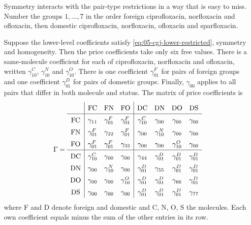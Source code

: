  Symmetry interacts with the pair-type restrictions in a way that is easy to
miss. Number the groups $1, \ldots, 7$ in the order foreign ciprofloxacin, norfloxacin and ofloxacin, then domestic
ciprofloxacin, norfloxacin, ofloxacin and sparfloxacin.

\begin{proposition}\label{prop:05-cgj-collapse}
Suppose the lower-level coefficients satisfy \eqref{eq:05-cgj-lower-restricted}, symmetry and homogeneity. Then the
price coefficients take only six free values. There is a same-molecule coefficient for each of ciprofloxacin,
norfloxacin and ofloxacin, written $\gamma^{C}_{10}$, $\gamma^{N}_{10}$ and $\gamma^{O}_{10}$. There is one
coefficient $\gamma^{F}_{01}$ for pairs of foreign groups and one coefficient $\gamma^{D}_{01}$ for pairs of domestic
groups. Finally, $\gamma_{00}$ applies to all pairs that differ in both molecule and status. The matrix of price
coefficients is
\begin{equation}\label{eq:05-cgj-gamma-matrix}
\def\arraystretch{1.45}
\Gamma =
\begin{array}{c|ccc|cccc}
 & \mathrm{FC} & \mathrm{FN} & \mathrm{FO} & \mathrm{DC} & \mathrm{DN} & \mathrm{DO} & \mathrm{DS} \\ \hline
\mathrm{FC} & \gamma_{11} & \gamma^{F}_{01} & \gamma^{F}_{01} & \gamma^{C}_{10} & \gamma_{00} & \gamma_{00} & \gamma_{00} \\
\mathrm{FN} & \gamma^{F}_{01} & \gamma_{22} & \gamma^{F}_{01} & \gamma_{00} & \gamma^{N}_{10} & \gamma_{00} & \gamma_{00} \\
\mathrm{FO} & \gamma^{F}_{01} & \gamma^{F}_{01} & \gamma_{33} & \gamma_{00} & \gamma_{00} & \gamma^{O}_{10} & \gamma_{00} \\ \hline
\mathrm{DC} & \gamma^{C}_{10} & \gamma_{00} & \gamma_{00} & \gamma_{44} & \gamma^{D}_{01} & \gamma^{D}_{01} & \gamma^{D}_{01} \\
\mathrm{DN} & \gamma_{00} & \gamma^{N}_{10} & \gamma_{00} & \gamma^{D}_{01} & \gamma_{55} & \gamma^{D}_{01} & \gamma^{D}_{01} \\
\mathrm{DO} & \gamma_{00} & \gamma_{00} & \gamma^{O}_{10} & \gamma^{D}_{01} & \gamma^{D}_{01} & \gamma_{66} & \gamma^{D}_{01} \\
\mathrm{DS} & \gamma_{00} & \gamma_{00} & \gamma_{00} & \gamma^{D}_{01} & \gamma^{D}_{01} & \gamma^{D}_{01} & \gamma_{77}
\end{array}
\end{equation}
where F and D denote foreign and domestic and C, N, O, S the molecules. Each own coefficient equals minus the sum of
the other entries in its row.
\end{proposition}

